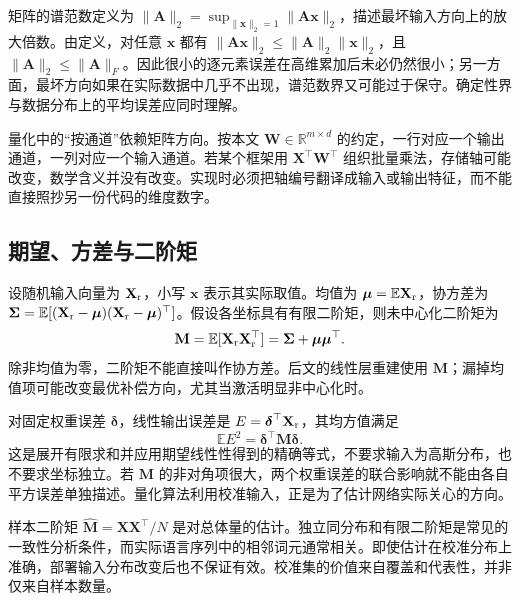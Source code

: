 \documentclass[UTF8,12pt,a4paper,fontset=fandol]{ctexart}
\begin{document}
矩阵的谱范数定义为 $\|\mathbf A\|_2=\sup_{\|\mathbf x\|_2=1}\|\mathbf A\mathbf x\|_2$，描述最坏输入方向上的放大倍数。由定义，对任意 $\mathbf x$ 都有 $\|\mathbf A\mathbf x\|_2\leq\|\mathbf A\|_2\|\mathbf x\|_2$，且 $\|\mathbf A\|_2\leq\|\mathbf A\|_F$。因此很小的逐元素误差在高维累加后未必仍然很小；另一方面，最坏方向如果在实际数据中几乎不出现，谱范数界又可能过于保守。确定性界与数据分布上的平均误差应同时理解。

量化中的“按通道”依赖矩阵方向。按本文 $\mathbf W\in\mathbb R^{m\times d}$ 的约定，一行对应一个输出通道，一列对应一个输入通道。若某个框架用 $\mathbf X^\top\mathbf W^\top$ 组织批量乘法，存储轴可能改变，数学含义并没有改变。实现时必须把轴编号翻译成输入或输出特征，而不能直接照抄另一份代码的维度数字。

\subsection{期望、方差与二阶矩}
设随机输入向量为 $\mathbf X_{\rm r}$，小写 $\mathbf x$ 表示其实际取值。均值为 $\boldsymbol\mu=\mathbb E\mathbf X_{\rm r}$，协方差为 $\boldsymbol\Sigma=\mathbb E[(\mathbf X_{\rm r}-\boldsymbol\mu)(\mathbf X_{\rm r}-\boldsymbol\mu)^\top]$。假设各坐标具有有限二阶矩，则未中心化二阶矩为
\begin{equation}
 \mathbf M=\mathbb E[\mathbf X_{\rm r}\mathbf X_{\rm r}^\top]
 =\boldsymbol\Sigma+\boldsymbol\mu\boldsymbol\mu^\top.
 \label{eq:quant-second-moment}
\end{equation}
除非均值为零，二阶矩不能直接叫作协方差。后文的线性层重建使用 $\mathbf M$；漏掉均值项可能改变最优补偿方向，尤其当激活明显非中心化时。

对固定权重误差 $\boldsymbol\delta$，线性输出误差是 $E=\boldsymbol\delta^\top\mathbf X_{\rm r}$，其均方值满足
\begin{equation}
 \mathbb E E^2=\boldsymbol\delta^\top\mathbf M\boldsymbol\delta.
 \label{eq:quant-output-mse}
\end{equation}
这是展开有限求和并应用期望线性性得到的精确等式，不要求输入为高斯分布，也不要求坐标独立。若 $\mathbf M$ 的非对角项很大，两个权重误差的联合影响就不能由各自平方误差单独描述。量化算法利用校准输入，正是为了估计网络实际关心的方向。

样本二阶矩 $\widehat{\mathbf M}=\mathbf X\mathbf X^\top/N$ 是对总体量的估计。独立同分布和有限二阶矩是常见的一致性分析条件，而实际语言序列中的相邻词元通常相关。即使估计在校准分布上准确，部署输入分布改变后也不保证有效。校准集的价值来自覆盖和代表性，并非仅来自样本数量。
\end{document}
